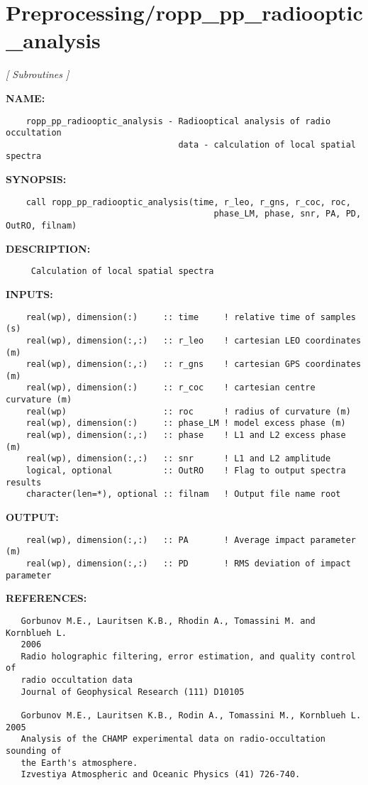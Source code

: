 \section{Preprocessing/ropp\_pp\_radiooptic\_analysis}
\textsl{[ Subroutines ]}

\label{ch:robo84}
\label{ch:Preprocessing_ropp_pp_radiooptic_analysis}
\textbf{NAME:}\hspace{0.08in}\begin{Verbatim}
    ropp_pp_radiooptic_analysis - Radiooptical analysis of radio occultation
                                  data - calculation of local spatial spectra
\end{Verbatim}
\textbf{SYNOPSIS:}\hspace{0.08in}\begin{Verbatim}
    call ropp_pp_radiooptic_analysis(time, r_leo, r_gns, r_coc, roc, 
                                         phase_LM, phase, snr, PA, PD, OutRO, filnam)
\end{Verbatim}
\textbf{DESCRIPTION:}\hspace{0.08in}\begin{Verbatim}
     Calculation of local spatial spectra
\end{Verbatim}
\textbf{INPUTS:}\hspace{0.08in}\begin{Verbatim}
    real(wp), dimension(:)     :: time     ! relative time of samples (s)
    real(wp), dimension(:,:)   :: r_leo    ! cartesian LEO coordinates (m)
    real(wp), dimension(:,:)   :: r_gns    ! cartesian GPS coordinates (m)
    real(wp), dimension(:)     :: r_coc    ! cartesian centre curvature (m)
    real(wp)                   :: roc      ! radius of curvature (m)
    real(wp), dimension(:)     :: phase_LM ! model excess phase (m)
    real(wp), dimension(:,:)   :: phase    ! L1 and L2 excess phase (m)
    real(wp), dimension(:,:)   :: snr      ! L1 and L2 amplitude
    logical, optional          :: OutRO    ! Flag to output spectra results
    character(len=*), optional :: filnam   ! Output file name root
\end{Verbatim}
\textbf{OUTPUT:}\hspace{0.08in}\begin{Verbatim}
    real(wp), dimension(:,:)   :: PA       ! Average impact parameter (m)
    real(wp), dimension(:,:)   :: PD       ! RMS deviation of impact parameter
\end{Verbatim}
\textbf{REFERENCES:}\hspace{0.08in}\begin{Verbatim}
   Gorbunov M.E., Lauritsen K.B., Rhodin A., Tomassini M. and Kornblueh L. 
   2006
   Radio holographic filtering, error estimation, and quality control of 
   radio occultation data
   Journal of Geophysical Research (111) D10105

   Gorbunov M.E., Lauritsen K.B., Rodin A., Tomassini M., Kornblueh L. 2005 
   Analysis of the CHAMP experimental data on radio-occultation sounding of
   the Earth's atmosphere.
   Izvestiya Atmospheric and Oceanic Physics (41) 726-740.
\end{Verbatim}
